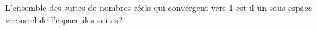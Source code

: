 L'ensemble des suites de nombres r{\'e}els qui convergent vers 1 est-il un sous espace vectoriel de l'espace des suites?
\bigskip